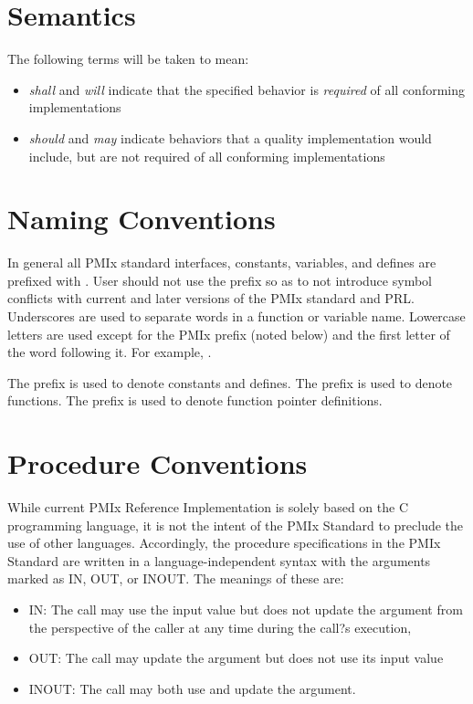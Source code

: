\section{Semantics}

The following terms will be taken to mean:

\begin{itemize}
\item \emph{shall} and \emph{will} indicate that the specified behavior is \emph{required} of all conforming implementations
\item \emph{should} and \emph{may} indicate behaviors that a quality implementation would include, but are not required of all conforming implementations
\end{itemize}

\section{Naming Conventions}

In general all \ac{PMIx} standard interfaces, constants, variables, and defines are prefixed with \textbf{}.
User should not use the \textbf{} prefix so as to not introduce symbol conflicts with current and later versions of the \ac{PMIx} standard and \ac{PRL}.
Underscores are used to separate words in a function or variable name.
Lowercase letters are used except for the \ac{PMIx} prefix (noted below) and the first letter of the word following it.
For example, .

The  prefix is used to denote constants and defines.
The  prefix is used to denote functions.
The  prefix is used to denote function pointer definitions.

\section{Procedure Conventions}

While current \ac{PMIx} Reference Implementation is solely based on the C programming language, it is not the intent of the \ac{PMIx} Standard to preclude the use of other languages.
Accordingly, the procedure specifications in the \ac{PMIx} Standard are written in a language-independent syntax with the arguments marked as IN, OUT, or INOUT.
The meanings of these are:
\begin{itemize}
\item IN:
The call may use the input value but does not update the argument from the perspective of the caller at any time during the call?s execution, 
\item OUT:
The call may update the argument but does not use its input value
\item INOUT:
The call may both use and update the argument. 
\end{itemize}

